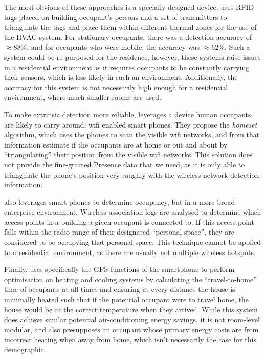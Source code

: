 \documentclass[../thesis/thesis.tex]{subfiles}
\begin{document}
The most obvious of these approaches is a specially designed device. \cite{li2012measuring} uses RFID tags placed on building occupant's persons and a set of transmitters to triangulate the tags and place them within different thermal zones for the use of the HVAC system. For stationary occupants, there was a detection accuracy of $\approx88\%$, and for occupants who were mobile, the accuracy was $\approx62\%$. Such a system could be re-purposed for the residence, however, these systems raise issues in a residential environment as it requires occupants to be constantly carrying their sensors, which is less likely in such an environment. Additionally, the accuracy for this system is not necessarily high enough for a residential environment, where much smaller rooms are used.

To make extrinsic detection more reliable, \cite{kleiminger2013inferring} leverages a device human occupants are likely to carry around; wifi enabled smart phones. They propose the \textit{homeset} algorithm, which uses the phones to scan the visible wifi networks, and from that information estimate if the occupants are at home or out and about by ``triangulating'' their position from the visible wifi networks. This solution does not provide the fine-grained Presence data that we need, as it is only able to triangulate the phone's position very roughly with the wireless network detection information.

\cite{balaji2013sentinel} also leverages smart phones to determine occupancy, but in a more broad enterprise environment: Wireless association logs are analysed to determine which access points in a building a given occupant is connected to. If this access point falls within the radio range of their designated ``personal space'', they are considered to be occupying that personal space. This technique cannot be applied to a residential environment, as there are usually not multiple wireless hotspots.

Finally, \cite{gupta2009adding} uses specifically the GPS functions of the smartphone to perform optimisation on heating and cooling systems by calculating the ``travel-to-home'' time of occupants at all times and ensuring at every distance the house is minimally heated such that if the potential occupant were to travel home, the house would be at the correct temperature when they arrived. While this system does achieve similar potential air-conditioning energy savings, it is not room-level modular, and also presupposes an occupant whose primary energy costs are from incorrect heating when away from home, which isn't necessarily the case for this demographic.
\end{document}
